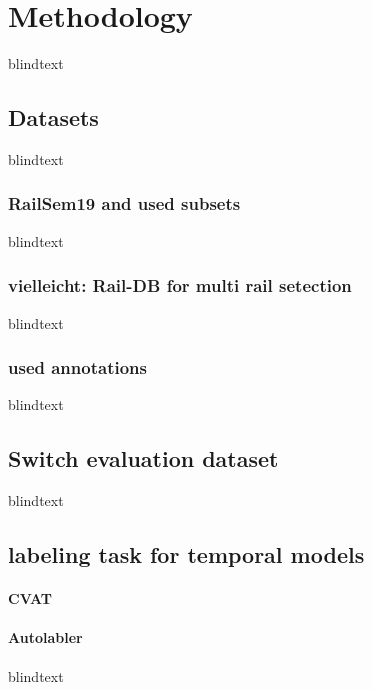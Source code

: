 \chapter{Methodology}
\label{sec:methodology}
blindtext

\section{Datasets}
blindtext

\subsection{RailSem19 and used subsets}
blindtext

\subsection{vielleicht: Rail-DB for multi rail setection}
blindtext

\subsection{used annotations}
blindtext

\section{Switch evaluation dataset}
blindtext

\section{labeling task for temporal models}

\subsubsection{CVAT}
\subsubsection{Autolabler}
blindtext








